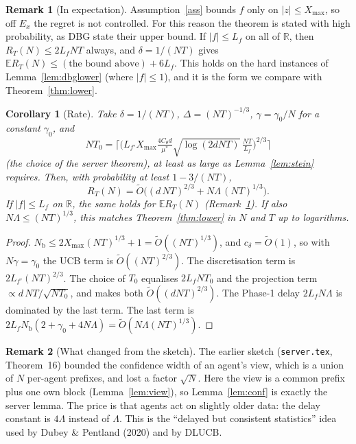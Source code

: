 \documentclass[11pt]{article}
\newtheorem{corollary}[theorem]{Corollary}
\theoremstyle{definition}
\newtheorem{remark}{Remark}
\newcommand{\E}{\mathbb{E}}
\newcommand{\R}{\mathbb{R}}
\newcommand{\Nb}{N_{\mathrm b}}
\newcommand{\Xmax}{X_{\max}}
\begin{document}
\begin{remark}[In expectation]\label{rem:expect}
Assumption~\ref{ass} bounds $f$ only on $|z|\le\Xmax$, so off $E_x$ the regret is not controlled. For this reason the
theorem is stated with high probability, as DBG state their upper bound. If $|f|\le L_f$ on all of $\R$, then
$R_T(N)\le2L_fNT$ always, and $\delta=1/(NT)$ gives $\E R_T(N)\le(\text{the bound above})+6L_f$. This holds on the hard
instances of Lemma~\ref{lem:dbglower} (where $|f|\le1$), and it is the form we compare with Theorem~\ref{thm:lower}.
\end{remark}

\begin{corollary}[Rate]\label{cor:rate}
Take $\delta=1/(NT)$, $\Delta=(NT)^{-1/3}$, $\gamma=\gamma_0/N$ for a constant $\gamma_0$, and
\[
NT_0=\Big\lceil\Big(L_{f'}\Xmax\tfrac{4C_\theta d}{\mu^*}\sqrt{\log(2dNT)}\,\tfrac{NT}{L_f}\Big)^{2/3}\Big\rceil
\]
(the choice of the server theorem), at least as large as Lemma~\ref{lem:stein} requires. Then, with probability at
least $1-3/(NT)$,
\[
R_T(N)=\tilde O\Big((d\,NT)^{2/3}+N\Lambda\,(NT)^{1/3}\Big).
\]
If $|f|\le L_f$ on $\R$, the same holds for $\E R_T(N)$ (Remark~\ref{rem:expect}). If also $N\Lambda\le(NT)^{1/3}$, this
matches Theorem~\ref{thm:lower} in $N$ and $T$ up to logarithms.
\end{corollary}
\begin{proof}
$\Nb\le2\Xmax(NT)^{1/3}+1=\tilde O((NT)^{1/3})$, and $c_\delta=\tilde O(1)$, so with $N\gamma=\gamma_0$ the UCB term
is $\tilde O((NT)^{2/3})$. The discretisation term is $2L_{f'}(NT)^{2/3}$. The choice of $T_0$ equalises
$2L_fNT_0$ and the projection term $\propto d\,NT/\sqrt{NT_0}$, and makes both $\tilde O((dNT)^{2/3})$. The Phase-1
delay $2L_fN\Lambda$ is dominated by the last term. The last term is
$2L_f\Nb(2+\gamma_0+4N\Lambda)=\tilde O(N\Lambda(NT)^{1/3})$.
\end{proof}

\begin{remark}[What changed from the sketch]
The earlier sketch (\texttt{server.tex}, Theorem~16) bounded the confidence width of an agent's view, which is a
union of $N$ per-agent prefixes, and lost a factor $\sqrt N$. Here the view is a common prefix plus one own block
(Lemma~\ref{lem:view}), so Lemma~\ref{lem:conf} is exactly the server lemma. The price is that agents act on
slightly older data: the delay constant is $4\Lambda$ instead of $\Lambda$. This is the ``delayed but consistent
statistics'' idea used by Dubey \& Pentland (2020) and by DLUCB.
\end{remark}
\end{document}
